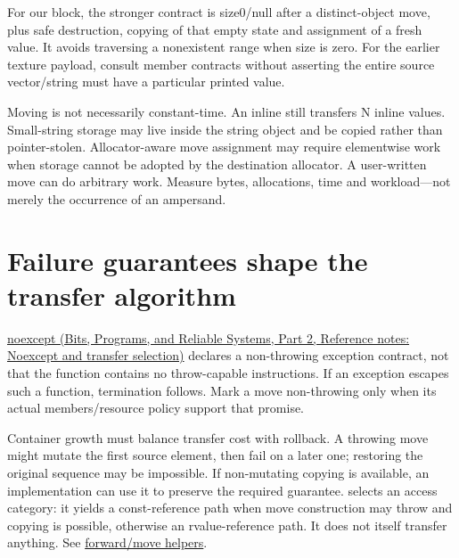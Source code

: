 For our block, the stronger contract is size0/null after a distinct-object move, plus safe destruction, copying of that empty state and assignment of a fresh value. It avoids traversing a nonexistent range when size is zero. For the earlier texture payload, consult member contracts without asserting the entire source vector/string must have a particular printed value.

Moving is not necessarily constant-time. An inline  still transfers N inline values. Small-string storage may live inside the string object and be copied rather than pointer-stolen. Allocator-aware move assignment may require elementwise work when storage cannot be adopted by the destination allocator. A user-written move can do arbitrary work. Measure bytes, allocations, time and workload---not merely the occurrence of an ampersand.

\section{Failure guarantees shape the transfer algorithm}\label{05-engine-i-ch003-failure-guarantees-shape-the-transfer-algorithm}

\hypertarget{05-engine-i-ch003-failure-guarantees-shape-the-transfer-algorithm}{}

\href{../01-Bits-Programs-and-Reliable-Systems-P02/main.pdf\#appendix-c746afaa47d1}{noexcept (Bits, Programs, and Reliable Systems, Part 2, Reference notes: Noexcept and transfer selection)} declares a non-throwing exception contract, not that the function contains no throw-capable instructions. If an exception escapes such a function, termination follows. Mark a move non-throwing only when its actual members/resource policy support that promise.

Container growth must balance transfer cost with rollback. A throwing move might mutate the first source element, then fail on a later one; restoring the original sequence may be impossible. If non-mutating copying is available, an implementation can use it to preserve the required guarantee.  selects an access category: it yields a const-reference path when move construction may throw and copying is possible, otherwise an rvalue-reference path. It does not itself transfer anything. See \href{https://eel.is/c++draft/forward}{forward/move helpers}.

